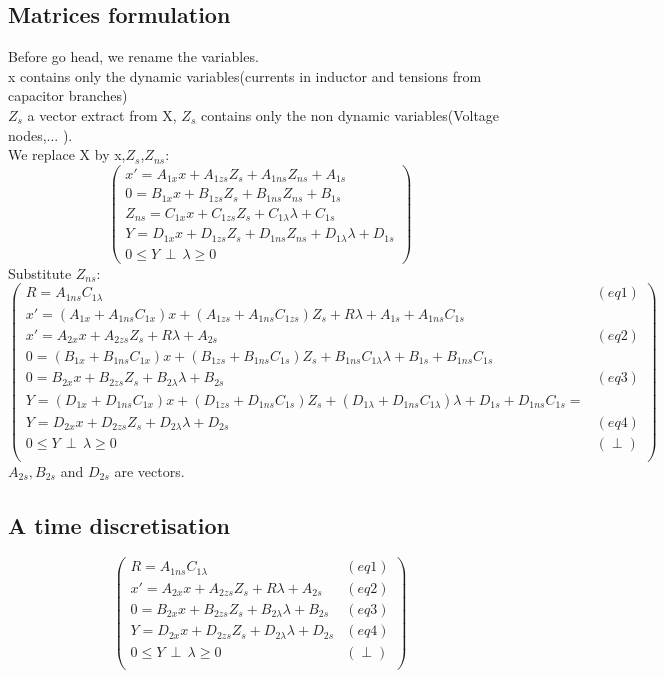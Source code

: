 \documentclass[10pt]{article}
\begin{document}
\subsection{Matrices formulation}
Before go head, we rename the variables.\\
x contains only the dynamic variables(currents in inductor and tensions from capacitor branches)\\
$Z_{s}$ a vector extract from X, $Z_{s}$ contains only the non dynamic variables(Voltage nodes,... ).\\

We replace X by x,$Z_{s}$,$Z_{ns}$:
\[\left(\begin{array}{c}
x'=A_{1x}x +A_{1zs}Z_{s} + A_{1ns}Z_{ns}+A_{1s}\\
0=B_{1x}x+B_{1zs}Z_{s} + B_{1ns}Z_{ns}+B_{1s}\\
Z_{ns}= C_{1x}x+C_{1zs}Z_{s}+C_{1\lambda}\lambda +C_{1s}\\
Y=D_{1x}x +D_{1zs}Z_{s}+D_{1ns}Z_{ns}+D_{1\lambda}\lambda+D_{1s}\\
0 \leq Y \, \perp \, \lambda \geq 0
\end{array}\right)\]
Substitute $Z_{ns}$:
\[\left(\begin{array}{cc}
R=A_{1ns}C_{1\lambda}&(eq1)\\
x'=(A_{1x}+A_{1ns}C_{1x})x +(A_{1zs}+A_{1ns}C_{1zs})Z_{s} +R\lambda+A_{1s} + A_{1ns}C_{1s}\\
x'=A_{2x}x +A_{2zs}Z_{s} +R \lambda +A_{2s}&(eq2)\\
0=(B_{1x}+B_{1ns}C_{1x})x+(B_{1zs}+B_{1ns}C_{1s})Z_{s} + B_{1ns}C_{1\lambda}\lambda +B_{1s} + B_{1ns}C_{1s} \\
0=B_{2x}x+B_{2zs}Z_{s} + B_{2\lambda}\lambda + B_{2s}&(eq3)\\
Y=(D_{1x}+D_{1ns}C_{1x})x+(D_{1zs}+D_{1ns}C_{1s})Z_{s}+(D_{1\lambda}+D_{1ns}C_{1\lambda})\lambda +D_{1s}+D_{1ns}C_{1s}=\\
Y=D_{2x}x+D_{2zs}Z_{s}+D_{2\lambda}\lambda + D_{2s} &(eq4)\\
0 \leq Y \, \perp \, \lambda \geq 0&(\perp)\\
\end{array}\right)\]
$A_{2s}, B_{2s}$ and $D_{2s}$ are vectors.
\newpage

\subsection{A time discretisation}
\[\left(\begin{array}{cc}
R=A_{1ns}C_{1\lambda}&(eq1)\\
x'=A_{2x}x +A_{2zs}Z_{s} +R \lambda +A_{2s}&(eq2)\\
0=B_{2x}x+B_{2zs}Z_{s} + B_{2\lambda}\lambda + B_{2s}&(eq3)\\
Y=D_{2x}x+D_{2zs}Z_{s}+D_{2\lambda}\lambda + D_{2s} &(eq4)\\
0 \leq Y \, \perp \, \lambda \geq 0&(\perp)\\
\end{array}\right)\]
\end{document}
